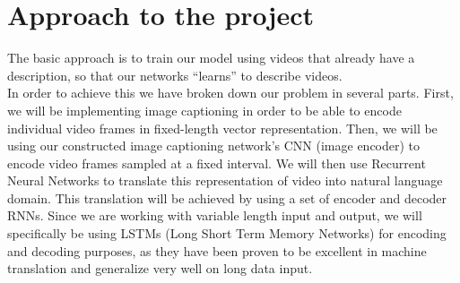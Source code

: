 \documentclass[11pt]{article}
\begin{document}
\section{Approach to the project}
		The basic approach is to train our model using videos that already have a description, so that our networks ``learns'' to describe videos.\\
		In order to achieve this we have broken down our problem in several parts. First, we will be implementing image captioning in order to be able to encode individual video frames in fixed-length vector representation.
		Then, we will be using our constructed image captioning network's CNN (image encoder) to encode video frames sampled at a fixed interval.
		We will then use Recurrent Neural Networks to translate this representation of video into natural language domain. This translation will be achieved by using a set of encoder and decoder RNNs. Since we are working with variable length input and output, we will specifically be using LSTMs (Long Short Term Memory Networks) for encoding and decoding purposes, as they have been proven to be excellent in machine translation and generalize very well on long data input.
\end{document}
